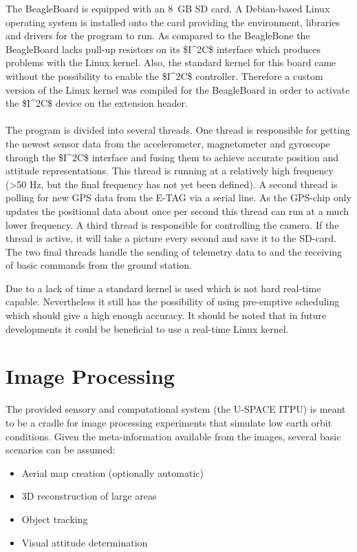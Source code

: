 The BeagleBoard is equipped with an 8~GB \ac{SD} card. A Debian-based Linux operating system is installed onto the card providing the environment, libraries and drivers for the program to run. As compared to the BeagleBone the
BeagleBoard lacks pull-up resistors on its \ac{$I^2C$} interface which produces problems with the Linux kernel. Also, the standard kernel for this board came without the possibility to enable the \ac{$I^2C$} controller. Therefore a custom version of the Linux kernel was compiled for the BeagleBoard in order to activate the \ac{$I^2C$} device on the extension header. 
\\
\\
The program is divided into several threads. One thread is responsible for getting the newest sensor data from the accelerometer, magnetometer and gyroscope through the \ac{$I^2C$} interface and fusing them to achieve accurate position and attitude representations. This thread is running at a relatively high frequency (>50 Hz, but the final frequency has not yet been defined).  A second thread is polling for new \ac{GPS} data from the E-TAG via a serial line. As the \ac{GPS}-chip only updates the positional data about once per second this thread can run at a much lower frequency. A third thread is responsible for controlling the camera. If the thread is active, it will take a picture every second and save it to the \ac{SD}-card. The two final threads handle the sending of telemetry data to and the receiving of basic commands from the ground station.

\noindent
Due to a lack of time a standard kernel is used which is not hard real-time capable. Nevertheless it still has the possibility of using pre-emptive scheduling which should give a high enough accuracy. It should be noted that in future
developments it could be beneficial to use a real-time Linux kernel.

\FloatBarrier
\section{Image Processing}

The provided sensory and computational system (the \ac{U-SPACE} \ac{ITPU}) is meant to be a cradle for image processing experiments that simulate low earth orbit conditions. Given the meta-information available from the images, several basic scenarios can be assumed:

\begin{itemize}
\item Aerial map creation (optionally automatic)
\item 3D reconstruction of large areas
\item Object tracking
\item Visual attitude determination
\end{itemize}

